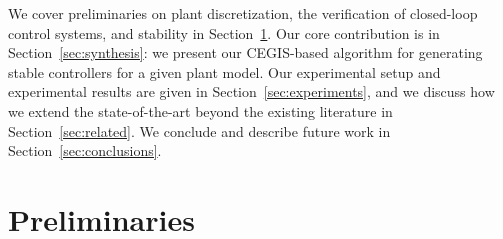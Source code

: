 \documentclass[final]{sig-alternate-05-2015}
\newcommand{\blue}[1]{{\color{blue}#1}}
\begin{document}

We cover preliminaries on plant discretization, the verification of
closed-loop control systems, and stability in
Section~\ref{sec:preliminaries}.  Our core contribution is in
Section~\ref{sec:synthesis}: we present our CEGIS-based algorithm for
generating stable controllers for a given plant model.  Our experimental
setup and experimental results are given in Section~\ref{sec:experiments},
and we discuss how we extend the state-of-the-art beyond the existing
literature in Section~\ref{sec:related}. We conclude and describe future
work in Section~\ref{sec:conclusions}.

\section{Preliminaries}\label{sec:preliminaries}

\end{document}
